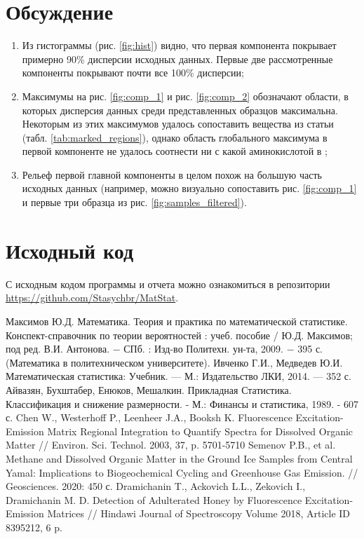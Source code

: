 \documentclass[a4paper]{article}
\begin{document}
\section{Обсуждение}
\begin{enumerate}
    \item Из гистограммы (рис. \ref{fig:hist}) видно, что первая компонента покрывает примерно 90\% дисперсии исходных данных. Первые две рассмотренные компоненты покрывают почти все 100\% дисперсии;
    \item Максимумы на рис. \ref{fig:comp_1} и рис. \ref{fig:comp_2} обозначают области, в которых дисперсия данных среди  представленных образцов максимальна. Некоторым из этих максимумов удалось сопоставить вещества  из статьи \cite{article1} (табл. \ref{tab:marked_regions}), однако область глобального максимума в первой компоненте не удалось соотнести ни с какой аминокислотой в \cite{article1};
    \item Рельеф первой главной компоненты в целом похож на большую часть исходных данных (например, можно визуально сопоставить рис. \ref{fig:comp_1} и первые три образца из рис. \ref{fig:samples_filtered}).
\end{enumerate}
\section*{Исходный код}
С исходным кодом программы и отчета можно ознакомиться в репозитории \url{https://github.com/Stasychbr/MatStat}.
\begin{thebibliography}{9}
 Максимов Ю.Д. Математика. Теория и практика по математической статистике. Конспект-справочник по теории вероятностей : учеб. пособие /
Ю.Д. Максимов; под ред. В.И. Антонова. $-$ СПб. : Изд-во Политехн.
ун-та, 2009. $-$ 395 с. (Математика в политехническом университете).
Ивченко Г.И., Медведев Ю.И. Математическая статистика: Учебник. — М.: Издательство ЛКИ, 2014. — 352 с. 
Айвазян, Бухштабер, Енюков, Мешалкин. Прикладная Статистика. Классификация и снижение размерности. - М.: Финансы и статистика, 1989. - 607 с.
Chen W., Westerhoff P., Leenheer J.A., Booksh K. Fluorescence Excitation-Emission
Matrix Regional Integration to
Quantify Spectra for Dissolved
Organic Matter // Environ. Sci. Technol. 2003, 37, p. 5701-5710
Semenov P.B., et al. Methane and Dissolved Organic Matter in the Ground Ice Samples from Central Yamal: Implications to Biogeochemical Cycling and Greenhouse Gas Emission. // Geosciences. 2020: 450 с.
Dramichanin T., Ackovich L.L., Zekovich I., Dramichanin M. D. Detection of Adulterated Honey by Fluorescence
Excitation-Emission Matrices // Hindawi Journal of Spectroscopy
Volume 2018, Article ID 8395212, 6 p.
\end{thebibliography}
\end{document}

